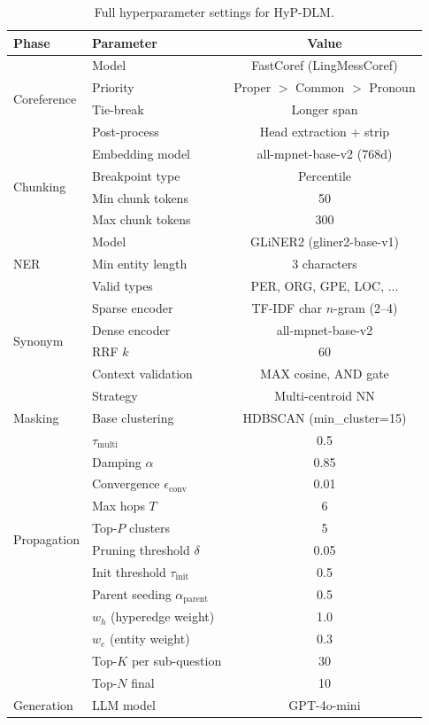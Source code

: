 \documentclass[11pt,a4paper]{article}
\begin{document}
\begin{table}[ht]
\centering
\caption{Full hyperparameter settings for HyP-DLM.}
\label{tab:hyperparams}
\small
\begin{tabular}{llc}
\toprule
Phase & Parameter & Value \\
\midrule
\multirow{4}{*}{Coreference} 
    & Model & FastCoref (LingMessCoref) \\
    & Priority & Proper $>$ Common $>$ Pronoun \\
    & Tie-break & Longer span \\
    & Post-process & Head extraction + strip \\
\midrule
\multirow{4}{*}{Chunking}
    & Embedding model & all-mpnet-base-v2 (768d) \\
    & Breakpoint type & Percentile \\
    & Min chunk tokens & 50 \\
    & Max chunk tokens & 300 \\
\midrule
\multirow{3}{*}{NER}
    & Model & GLiNER2 (gliner2-base-v1) \\
    & Min entity length & 3 characters \\
    & Valid types & PER, ORG, GPE, LOC, ... \\
\midrule
\multirow{4}{*}{Synonym}
    & Sparse encoder & TF-IDF char $n$-gram (2--4) \\
    & Dense encoder & all-mpnet-base-v2 \\
    & RRF $k$ & 60 \\
    & Context validation & MAX cosine, AND gate \\
\midrule
\multirow{3}{*}{Masking}
    & Strategy & Multi-centroid NN \\
    & Base clustering & HDBSCAN (min\_cluster=15) \\
    & $\tau_{\text{multi}}$ & 0.5 \\
\midrule
\multirow{8}{*}{Propagation}
    & Damping $\alpha$ & 0.85 \\
    & Convergence $\epsilon_{\text{conv}}$ & 0.01 \\
    & Max hops $T$ & 6 \\
    & Top-$P$ clusters & 5 \\
    & Pruning threshold $\delta$ & 0.05 \\
    & Init threshold $\tau_{\text{init}}$ & 0.5 \\
    & Parent seeding $\alpha_{\text{parent}}$ & 0.5 \\
\midrule
\multirow{3}{*}{Scoring}
    & $w_h$ (hyperedge weight) & 1.0 \\
    & $w_e$ (entity weight) & 0.3 \\
    & Top-$K$ per sub-question & 30 \\
    & Top-$N$ final & 10 \\
\midrule
Generation & LLM model & GPT-4o-mini \\
\bottomrule
\end{tabular}
\end{table}
\end{document}
